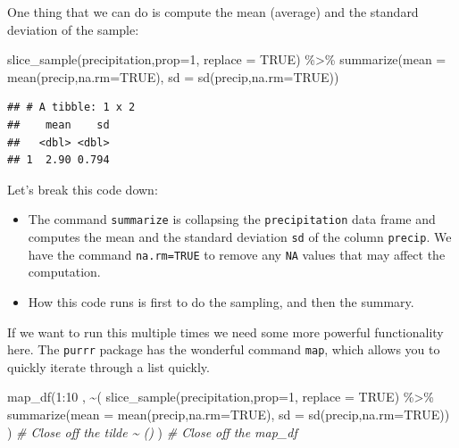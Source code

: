 \documentclass[
]{book}
\newenvironment{Shaded}{\begin{snugshade}}{\end{snugshade}}
\newcommand{\AttributeTok}[1]{\textcolor[rgb]{0.77,0.63,0.00}{#1}}
\newcommand{\CommentTok}[1]{\textcolor[rgb]{0.56,0.35,0.01}{\textit{#1}}}
\newcommand{\ConstantTok}[1]{\textcolor[rgb]{0.00,0.00,0.00}{#1}}
\newcommand{\DecValTok}[1]{\textcolor[rgb]{0.00,0.00,0.81}{#1}}
\newcommand{\FunctionTok}[1]{\textcolor[rgb]{0.00,0.00,0.00}{#1}}
\newcommand{\NormalTok}[1]{#1}
\newcommand{\SpecialCharTok}[1]{\textcolor[rgb]{0.00,0.00,0.00}{#1}}
\providecommand{\tightlist}{%
  \setlength{\itemsep}{0pt}\setlength{\parskip}{0pt}}
\theoremstyle{definition}
\theoremstyle{definition}
\theoremstyle{definition}
\theoremstyle{remark}
\begin{document}
One thing that we can do is compute the mean (average) and the standard deviation of the sample:

\begin{Shaded}
\begin{Highlighting}[]
\FunctionTok{slice\_sample}\NormalTok{(precipitation,}\AttributeTok{prop=}\DecValTok{1}\NormalTok{, }\AttributeTok{replace =} \ConstantTok{TRUE}\NormalTok{) }\SpecialCharTok{\%\textgreater{}\%}
  \FunctionTok{summarize}\NormalTok{(}\AttributeTok{mean =} \FunctionTok{mean}\NormalTok{(precip,}\AttributeTok{na.rm=}\ConstantTok{TRUE}\NormalTok{),}
            \AttributeTok{sd =} \FunctionTok{sd}\NormalTok{(precip,}\AttributeTok{na.rm=}\ConstantTok{TRUE}\NormalTok{))}
\end{Highlighting}
\end{Shaded}

\begin{verbatim}
## # A tibble: 1 x 2
##    mean    sd
##   <dbl> <dbl>
## 1  2.90 0.794
\end{verbatim}

Let's break this code down:

\begin{itemize}
\tightlist
\item
  The command \texttt{summarize} is collapsing the \texttt{precipitation} data frame and computes the mean and the standard deviation \texttt{sd} of the column \texttt{precip}. We have the command \texttt{na.rm=TRUE} to remove any \texttt{NA} values that may affect the computation.
\item
  How this code runs is first to do the sampling, and then the summary.
\end{itemize}

If we want to run this multiple times we need some more powerful functionality here. The \texttt{purrr} package has the wonderful command \texttt{map}, which allows you to quickly iterate through a list quickly.

\begin{Shaded}
\begin{Highlighting}[]
 \FunctionTok{map\_df}\NormalTok{(}\DecValTok{1}\SpecialCharTok{:}\DecValTok{10}\NormalTok{ ,}
        \SpecialCharTok{\textasciitilde{}}\NormalTok{(}
          \FunctionTok{slice\_sample}\NormalTok{(precipitation,}\AttributeTok{prop=}\DecValTok{1}\NormalTok{, }\AttributeTok{replace =} \ConstantTok{TRUE}\NormalTok{) }\SpecialCharTok{\%\textgreater{}\%}
                    \FunctionTok{summarize}\NormalTok{(}\AttributeTok{mean =} \FunctionTok{mean}\NormalTok{(precip,}\AttributeTok{na.rm=}\ConstantTok{TRUE}\NormalTok{),}
                              \AttributeTok{sd =} \FunctionTok{sd}\NormalTok{(precip,}\AttributeTok{na.rm=}\ConstantTok{TRUE}\NormalTok{)) }
\NormalTok{          )  }\CommentTok{\# Close off the tilde \textasciitilde{} ()}
\NormalTok{        )  }\CommentTok{\# Close off the map\_df}
\end{Highlighting}
\end{Shaded}
\end{document}
